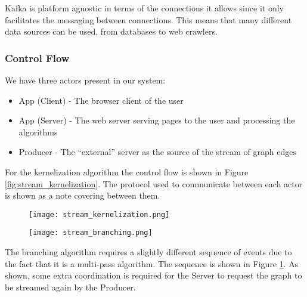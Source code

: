 Kafka is platform agnostic in terms of the connections it allows since
it only facilitates the messaging between connections. This means that
many different data sources can be used, from databases to web crawlers.

\subsubsection{Control Flow}

We have three actors present in our system:

\begin{itemize}
    \item
          App (Client) - The browser client of the user
    \item
          App (Server) - The web server serving pages to the user and processing
          the algorithms
    \item
          Producer - The ``external'' server as the source of the stream of
          graph edges
\end{itemize}

For the kernelization algorithm the control flow is shown in Figure
\ref{fig:stream_kernelization}. The protocol used to communicate between
each actor is shown as a note covering between them.

\begin{figure}[H]
    \centering
    \begin{minipage}{.5\textwidth}
        \centering
        \texttt{[image: stream\_kernelization.png]}
        \label{fig:stream_kernelization}
    \end{minipage}%
    \begin{minipage}{.5\textwidth}
        \centering
        \texttt{[image: stream\_branching.png]}
        \label{fig:stream_branching}
    \end{minipage}
\end{figure}

The branching algorithm requires a slightly different sequence of events
due to the fact that it is a multi-pass algorithm. The sequence is shown
in Figure \ref{fig:stream_branching}. As shown, some extra coordination
is required for the Server to request the graph to be streamed again by
the Producer.
